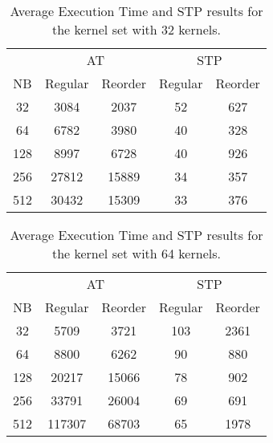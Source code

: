 \documentclass[conference]{IEEEtran}
\begin{document}
\begin{table}[htb]
    \centering
    \begin{tabular}{|c|c|c|c|c|} \hline
      & \multicolumn{2}{|c|}{AT} & \multicolumn{2}{|c|}{STP} \\ \cline{2-5}
 NB   & Regular & Reorder & Regular & Reorder \\ \hline
 32   & 3084    & 2037           & 52      & 627            \\ \hline
 64   & 6782    & 3980           & 40      & 328            \\ \hline
 128  & 8997    & 6728           & 40      & 926            \\ \hline
 256  & 27812   & 15889          & 34      & 357            \\ \hline
 512  & 30432   & 15309          & 33      & 376            \\ \hline
    \end{tabular}
    \caption{Average Execution Time and STP results for the kernel set with 32 kernels.}
    \label{tab:32kernels-kepler}
\end{table}

\begin{table}[htb]
    \centering
    \begin{tabular}{|c|c|c|c|c|} \hline
      & \multicolumn{2}{|c|}{AT} & \multicolumn{2}{|c|}{STP} \\ \cline{2-5}
 NB   & Regular & Reorder & Regular & Reorder \\ \hline
 32   & 5709    & 3721           & 103     & 2361           \\ \hline
 64   & 8800    & 6262           & 90      & 880            \\ \hline
 128  & 20217   & 15066          & 78      & 902            \\ \hline
 256  & 33791   & 26004          & 69      & 691            \\ \hline
 512  & 117307  & 68703          & 65      & 1978           \\ \hline
    \end{tabular}
    \caption{Average Execution Time and STP results for the kernel set with 64 kernels.}
    \label{tab:64kernels-kepler}
\end{table}
\end{document}
